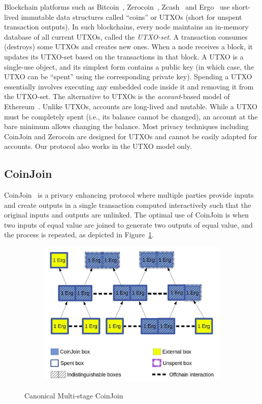 \documentclass[runningheads]{llncs}
\newcommand{\zerocoin}{Zerocoin\xspace}
\begin{document}
Blockchain platforms such as Bitcoin~\cite{Nak08}, \zerocoin~\cite{zerocoin}, Zcash~\cite{zcash} and Ergo~\cite{ergo} use short-lived immutable data structures called ``coins'' or UTXOs (short for {unspent transaction outputs}). In such blockchains, every node maintains an in-memory database of all current UTXOs, called the {\em UTXO-set}. A transaction consumes (destroys) some UTXOs and creates new ones. When a node receives a block, it updates its UTXO-set based on the transactions in that block. A UTXO is a single-use object, and its simplest form contains a public key (in which case, the UTXO can be ``spent'' using the corresponding private key). Spending a UTXO essentially involves executing any embedded code inside it and removing it from the UTXO-set. 
The alternative to UTXOs is the {\em account}-based model of Ethereum~\cite{wood2014ethereum}. Unlike UTXOs, accounts are long-lived and mutable. While a UTXO must be completely spent (i.e., its balance cannot be changed), an account at the bare minimum allows changing the balance. Most privacy techniques including CoinJoin and \zerocoin are designed for UTXOs and cannot be easily adapted for accounts. Our protocol also works in the UTXO model only. 

\subsection{CoinJoin} 
\label{coinjoin}
CoinJoin~\cite{coinjoin} is a privacy enhancing protocol where multiple parties provide inputs and create outputs in a single transaction computed interactively such that the original inputs and outputs are unlinked. The optimal use of CoinJoin is when two inputs of equal value are joined to generate two outputs of equal value, and the process is repeated, as depicted in Figure~\ref{fig:coinjoin}. 

\begin{figure}[h]
	\centering
	\begin{subfigure}{.6\textwidth}
		\centering
		\includegraphics[width=\linewidth]{CoinJoin.jpg}
	\end{subfigure}%
	\caption{Canonical Multi-stage CoinJoin}
	\label{fig:coinjoin}
\end{figure}
\end{document}
